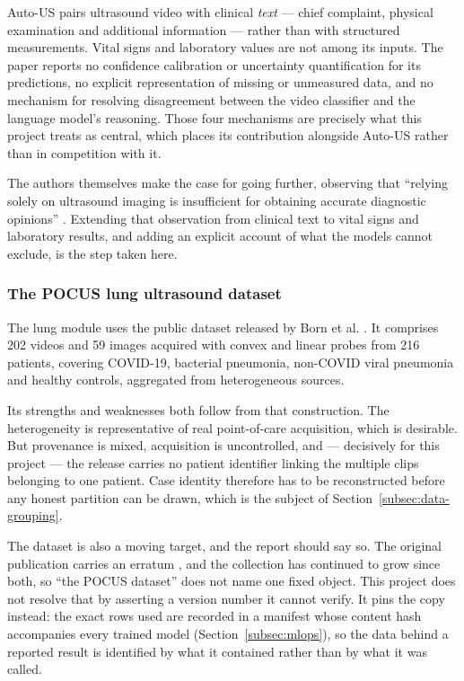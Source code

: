 Auto-US pairs ultrasound video with clinical \emph{text} --- chief complaint, physical
examination and additional information --- rather than with structured measurements. Vital
signs and laboratory values are not among its inputs. The paper reports no confidence
calibration or uncertainty quantification for its predictions, no explicit representation
of missing or unmeasured data, and no mechanism for resolving disagreement between the
video classifier and the language model's reasoning. Those four mechanisms are precisely
what this project treats as central, which places its contribution alongside Auto-US rather
than in competition with it.

The authors themselves make the case for going further, observing that ``relying solely on
ultrasound imaging is insufficient for obtaining accurate diagnostic opinions''
\cite{yang2025autous}. Extending that observation from clinical text to vital signs and
laboratory results, and adding an explicit account of what the models cannot exclude, is
the step taken here.

\subsubsection{The POCUS lung ultrasound dataset}

The lung module uses the public dataset released by Born et al.
\cite{born2021pocus}. It comprises 202 videos and 59 images acquired with convex and linear
probes from 216 patients, covering COVID-19, bacterial pneumonia, non-COVID viral
pneumonia and healthy controls, aggregated from heterogeneous sources.

Its strengths and weaknesses both follow from that construction. The heterogeneity is
representative of real point-of-care acquisition, which is desirable. But provenance is
mixed, acquisition is uncontrolled, and --- decisively for this project --- the release
carries no patient identifier linking the multiple clips belonging to one patient. Case
identity therefore has to be reconstructed before any honest partition can be drawn, which
is the subject of Section~\ref{subsec:data-grouping}.

The dataset is also a moving target, and the report should say so. The original publication
carries an erratum \cite{born2022erratum}, and the collection has continued to grow since
both, so ``the POCUS dataset'' does not name one fixed object. This project does not resolve
that by asserting a version number it cannot verify. It pins the copy instead: the exact rows
used are recorded in a manifest whose content hash accompanies every trained model
(Section~\ref{subsec:mlops}), so the data behind a reported result is identified by what it
contained rather than by what it was called.


